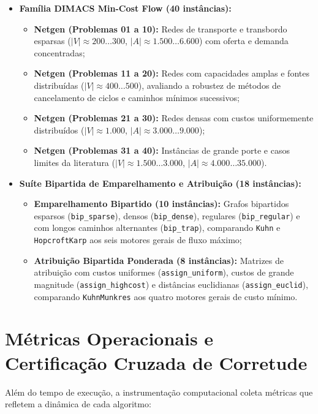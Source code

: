 \begin{itemize}
    \item \textbf{Família DIMACS Min-Cost Flow (40 instâncias):}
    \begin{itemize}
        \item \textbf{Netgen (Problemas 01 a 10):} Redes de transporte e transbordo esparsas ($|V| \approx 200 \dots 300$, $|A| \approx 1.500 \dots 6.600$) com oferta e demanda concentradas;
        \item \textbf{Netgen (Problemas 11 a 20):} Redes com capacidades amplas e fontes distribuídas ($|V| \approx 400 \dots 500$), avaliando a robustez de métodos de cancelamento de ciclos e caminhos mínimos sucessivos;
        \item \textbf{Netgen (Problemas 21 a 30):} Redes densas com custos uniformemente distribuídos ($|V| \approx 1.000$, $|A| \approx 3.000 \dots 9.000$);
        \item \textbf{Netgen (Problemas 31 a 40):} Instâncias de grande porte e casos limites da literatura ($|V| \approx 1.500 \dots 3.000$, $|A| \approx 4.000 \dots 35.000$).
    \end{itemize}

    \item \textbf{Suíte Bipartida de Emparelhamento e Atribuição (18 instâncias):}
    \begin{itemize}
        \item \textbf{Emparelhamento Bipartido (10 instâncias):} Grafos bipartidos esparsos (\texttt{bip\_sparse}), densos (\texttt{bip\_dense}), regulares (\texttt{bip\_regular}) e com longos caminhos alternantes (\texttt{bip\_trap}), comparando \lstinline{Kuhn} e \lstinline{HopcroftKarp} aos seis motores gerais de fluxo máximo;
        \item \textbf{Atribuição Bipartida Ponderada (8 instâncias):} Matrizes de atribuição com custos uniformes (\texttt{assign\_uniform}), custos de grande magnitude (\texttt{assign\_highcost}) e distâncias euclidianas (\texttt{assign\_euclid}), comparando \lstinline{KuhnMunkres} aos quatro motores gerais de custo mínimo.
    \end{itemize}
\end{itemize}


\section{Métricas Operacionais e Certificação Cruzada de Corretude}\label{sec:bench_metricas}

Além do tempo de execução, a instrumentação computacional coleta métricas que refletem a dinâmica de cada algoritmo:

